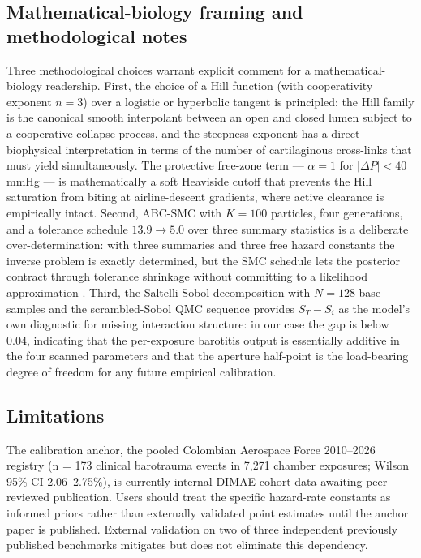 \documentclass[11pt,a4paper]{article}
\begin{document}
\subsection{Mathematical-biology framing and methodological notes}

Three methodological choices warrant explicit comment for a mathematical-biology readership. First, the choice of a Hill function (with cooperativity exponent $n = 3$) over a logistic or hyperbolic tangent is principled: the Hill family is the canonical smooth interpolant between an open and closed lumen subject to a cooperative collapse process, and the steepness exponent has a direct biophysical interpretation in terms of the number of cartilaginous cross-links that must yield simultaneously. The protective free-zone term --- $\alpha = 1$ for $|\Delta P| < 40$ mmHg --- is mathematically a soft Heaviside cutoff that prevents the Hill saturation from biting at airline-descent gradients, where active clearance is empirically intact. Second, ABC-SMC with $K = 100$ particles, four generations, and a tolerance schedule $13.9 \rightarrow 5.0$ over three summary statistics is a deliberate over-determination: with three summaries and three free hazard constants the inverse problem is exactly determined, but the SMC schedule lets the posterior contract through tolerance shrinkage without committing to a likelihood approximation \citep{Toni2009}. Third, the Saltelli-Sobol decomposition with $N = 128$ base samples and the scrambled-Sobol QMC sequence \citep{Saltelli2010} provides $S_T - S_i$ as the model's own diagnostic for missing interaction structure: in our case the gap is below 0.04, indicating that the per-exposure barotitis output is essentially additive in the four scanned parameters and that the aperture half-point is the load-bearing degree of freedom for any future empirical calibration.

\subsection{Limitations}

The calibration anchor, the pooled Colombian Aerospace Force 2010--2026 registry (n = 173 clinical barotrauma events in 7,271 chamber exposures; Wilson 95\% CI 2.06--2.75\%), is currently internal DIMAE cohort data awaiting peer-reviewed publication. Users should treat the specific hazard-rate constants as informed priors rather than externally validated point estimates until the anchor paper is published. External validation on two of three independent previously published benchmarks mitigates but does not eliminate this dependency.
\end{document}
